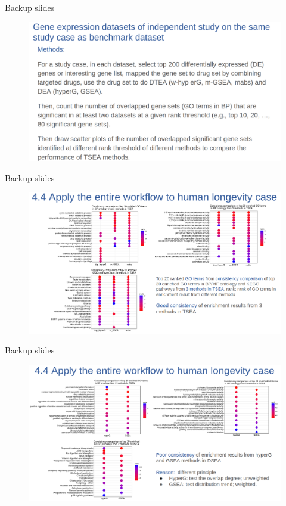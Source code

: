 \documentclass[10pt]{beamer}
\begin{document}
\begin{frame}[fragile]{Backup slides}
    \begin{figure}
        \includegraphics[width=12cm]{demo/images/ind_case3.png}
    \end{figure}
\end{frame}
\begin{frame}[fragile]{Backup slides}
    \begin{figure}
        \includegraphics[width=12cm]{demo/images/cmp_tsea_methods.png}
    \end{figure}
\end{frame}
\begin{frame}[fragile]{Backup slides}
    \begin{figure}
        \includegraphics[width=12cm]{demo/images/cmp_dsea_methods.png}
    \end{figure}
\end{frame}
\end{document}
